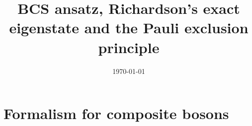 \documentclass[aps,prb,preprint,groupedaddress,amsmath]{revtex4}
\begin{document}

\title{BCS ansatz, Richardson's exact eigenstate and the Pauli exclusion principle}


\author{}
\affiliation{}


\date{\today}

\begin{abstract}
\end{abstract}

\pacs{}

\maketitle

\section{Formalism for composite bosons\label{sec:formalism}}
\end{document}
